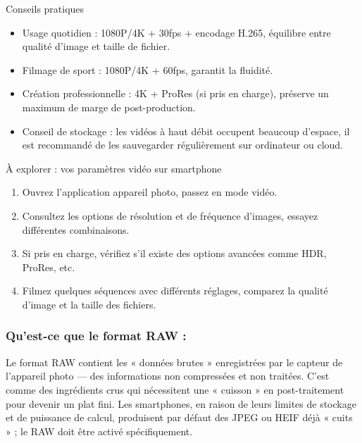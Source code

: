 \begin{tcbinfo}{Conseils pratiques}
\begin{itemize}
  \item Usage quotidien : 1080P/4K + 30fps + encodage H.265, équilibre entre qualité d'image et taille de fichier.
  \item Filmage de sport : 1080P/4K + 60fps, garantit la fluidité.
  \item Création professionnelle : 4K + ProRes (si pris en charge), préserve un maximum de marge de post-production.
  \item Conseil de stockage : les vidéos à haut débit occupent beaucoup d'espace, il est recommandé de les sauvegarder régulièrement sur ordinateur ou cloud.
\end{itemize}

\end{tcbinfo}

\begin{tcbpractice}{À explorer : vos paramètres vidéo sur smartphone}
\begin{enumerate}
  \item Ouvrez l'application appareil photo, passez en mode vidéo.
  \item Consultez les options de résolution et de fréquence d'images, essayez différentes combinaisons.
  \item Si pris en charge, vérifiez s'il existe des options avancées comme HDR, ProRes, etc.
  \item Filmez quelques séquences avec différents réglages, comparez la qualité d'image et la taille des fichiers.
\end{enumerate}

\end{tcbpractice}


\subsubsection*{Qu'est-ce que le format RAW :}

Le format RAW contient les « données brutes » enregistrées par le capteur de l'appareil photo — des informations non compressées et non traitées. C'est comme des ingrédients crus qui nécessitent une « cuisson » en post-traitement pour devenir un plat fini. Les smartphones, en raison de leurs limites de stockage et de puissance de calcul, produisent par défaut des JPEG ou HEIF déjà « cuits » ; le RAW doit être activé spécifiquement.

